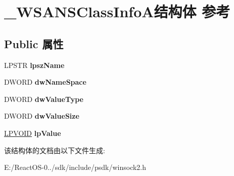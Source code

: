 \hypertarget{struct___w_s_a_n_s_class_info_a}{}\section{\+\_\+\+W\+S\+A\+N\+S\+Class\+Info\+A结构体 参考}
\label{struct___w_s_a_n_s_class_info_a}
\subsection*{Public 属性}
\begin{DoxyCompactItemize}
\item 
\mbox{\label{struct___w_s_a_n_s_class_info_a_a21e263afc025807bb8c005129e064c0e}} 
L\+P\+S\+TR {\bfseries lpsz\+Name}
\item 
\mbox{\label{struct___w_s_a_n_s_class_info_a_a6fea932571c2d44767866f28f6018425}} 
D\+W\+O\+RD {\bfseries dw\+Name\+Space}
\item 
\mbox{\label{struct___w_s_a_n_s_class_info_a_ac0b3182fd6e863cac105918223781ae2}} 
D\+W\+O\+RD {\bfseries dw\+Value\+Type}
\item 
\mbox{\label{struct___w_s_a_n_s_class_info_a_a511447071f1d2a52e09de3dfd32fbe60}} 
D\+W\+O\+RD {\bfseries dw\+Value\+Size}
\item 
\mbox{\label{struct___w_s_a_n_s_class_info_a_a39e4ffc181179edf9c0f1a4602cc8c7f}} 
\hyperlink{interfacevoid}{L\+P\+V\+O\+ID} {\bfseries lp\+Value}
\end{DoxyCompactItemize}


该结构体的文档由以下文件生成\+:\begin{DoxyCompactItemize}
\item 
E\+:/\+React\+O\+S-\/0../sdk/include/psdk/winsock2.\+h\end{DoxyCompactItemize}
